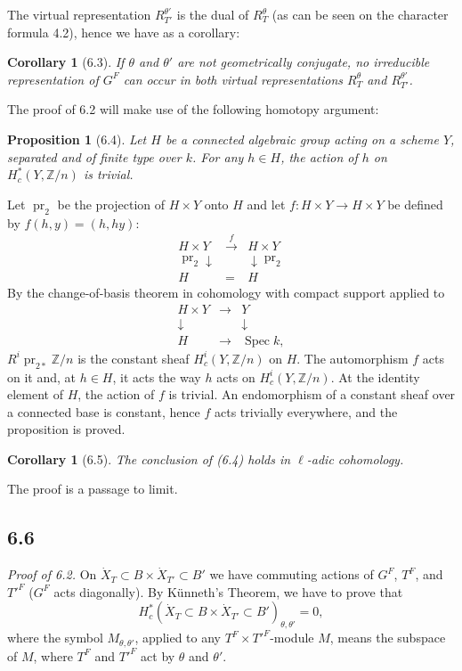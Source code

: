 \documentclass[11pt]{amsart}
\theoremstyle{plain}
\newtheorem{proposition}[theorem]{Proposition}
\newtheorem{corollary}[theorem]{Corollary}
\theoremstyle{remark}
\DeclareMathOperator{\pr}{pr}
\DeclareMathOperator{\Spec}{Spec}
\begin{document}
The virtual representation $R_{T'}^{\theta'}$ is the dual of $R_T^\theta$ (as can be seen on the character formula 4.2), hence we have as a corollary:

\begin{corollary}[6.3]
If $\theta$ and $\theta'$ are not geometrically conjugate, no irreducible representation of $G^F$ can occur in both virtual representations $R_T^\theta$ and $R_{T'}^{\theta'}$.
\end{corollary}

The proof of 6.2 will make use of the following homotopy argument:

\begin{proposition}[6.4]
Let $H$ be a connected algebraic group acting on a scheme $Y$, separated and of finite type over $k$. For any $h \in H$, the action of $h$ on $H_c^*(Y, \mathbb{Z}/n)$ is trivial.
\end{proposition}

Let $\pr_2$ be the projection of $H \times Y$ onto $H$ and let $f: H \times Y \to H \times Y$ be defined by $f(h, y) = (h, hy)$:
\[
\begin{array}{ccc}
H \times Y & \xrightarrow{f} & H \times Y \\
\pr_2 \downarrow & & \downarrow \pr_2 \\
H & = & H
\end{array}
\]
By the change-of-basis theorem in cohomology with compact support applied to
\[
\begin{array}{ccc}
H \times Y & \longrightarrow & Y \\
\downarrow & & \downarrow \\
H & \longrightarrow & \Spec k,
\end{array}
\]
$R^i\pr_{2*} \mathbb{Z}/n$ is the constant sheaf $H_c^i(Y, \mathbb{Z}/n)$ on $H$. The automorphism $f$ acts on it and, at $h \in H$, it acts the way $h$ acts on $H_c^i(Y, \mathbb{Z}/n)$. At the identity element of $H$, the action of $f$ is trivial. An endomorphism of a constant sheaf over a connected base is constant, hence $f$ acts trivially everywhere, and the proposition is proved.

\begin{corollary}[6.5]
The conclusion of (6.4) holds in $\ell$-adic cohomology.
\end{corollary}

The proof is a passage to limit.

\subsection{6.6} \textit{Proof of 6.2.} On $\dot{X}_T \subset B \times \dot{X}_{T'} \subset B'$ we have commuting actions of $G^F$, $T^F$, and $T'^F$ ($G^F$ acts diagonally). By K\"unneth's Theorem, we have to prove that
\[
H_c^*(\dot{X}_T \subset B \times \dot{X}_{T'} \subset B')_{\theta, \theta'} = 0,
\]
where the symbol $M_{\theta, \theta'}$, applied to any $T^F \times T'^F$-module $M$, means the subspace of $M$, where $T^F$ and $T'^F$ act by $\theta$ and $\theta'$.
\end{document}
